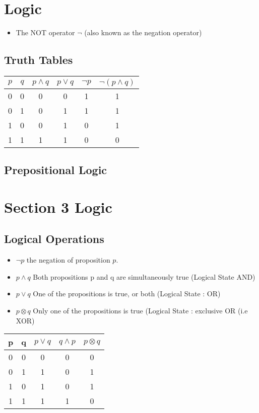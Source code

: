 
\section{Logic}
\begin{itemize}
	\item The NOT operator $\neg$ (also known as the negation operator)
\end{itemize}
\subsection{Truth Tables}
{
	\begin{center}
		\begin{tabular}{|c|c||c|c||c|c|}
			\hline $p$ & $q$ & $p \wedge q$ & $p\vee q$ & $\neg p$  & $\neg (p \wedge q)$ \\ 
			\hline 0 & 0 & 0 & 0 & 1 & 1 \\ 
			\hline 0 & 1 & 0 & 1 & 1 & 1 \\ 
			\hline 1 & 0 & 0 & 1 & 0 & 1 \\ 
			\hline 1 & 1 & 1 & 1 & 0 & 0 \\ 
			\hline 
		\end{tabular} 
	\end{center}
}

\subsection*{Prepositional Logic}

\section{Section 3 Logic}
\subsection{Logical Operations}
\begin{itemize}
\item $\neg p$ the negation of proposition $p$.
\item $p \wedge q$ Both propositions p and q are simultaneously true (Logical State AND)
\item $p \vee q $ One of the propositions is true, or both (Logical State : OR)
\item $p \otimes q$ Only one of the propositions is true (Logical State : exclusive OR (i.e XOR)
\end{itemize}
\begin{center}
\begin{tabular}{|c|c|c|c|c|}
\hline
p & q & $p \vee q$ & $q \wedge p$ & $p \otimes q$ \\
\hline
0 & 0 & 0 & 0 & 0 \\
0 & 1 & 1 & 0 & 1\\
1 & 0 & 1 & 0 & 1 \\
1 & 1 & 1 & 1 & 0\\
\hline
\end{tabular}
\end{center}
